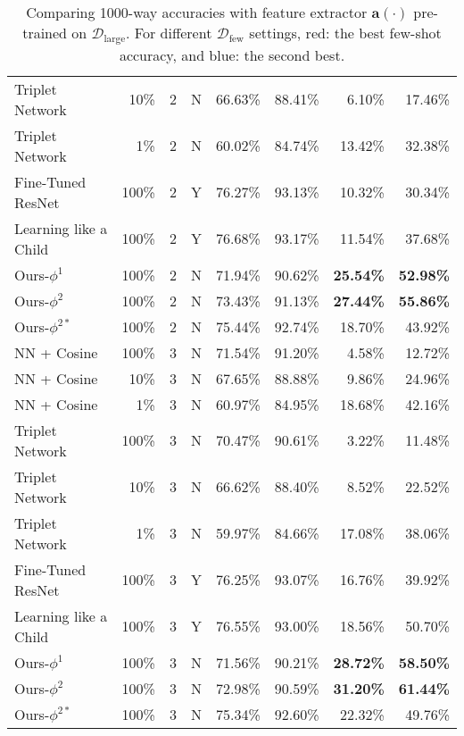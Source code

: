 \begin{table*}
\begin{tabular}{lrccll:rr}
        Triplet Network~\cite{siamese,lin2017transfer}  &  10\% & 2 & N & 66.63\% & 88.41\% & 6.10\% & 17.46\% \\
        Triplet Network~\cite{siamese,lin2017transfer}  &   1\% & 2 & N & 60.02\% & 84.74\% & 13.42\% & 32.38\% \\
        Fine-Tuned ResNet~\cite{DBLP:conf/cvpr/HeZRS16} & 100\% & 2 & Y & 76.27\% & 93.13\% & 10.32\% & 30.34\% \\
        Learning like a Child~\cite{mao2015learning} & 100\% & 2 & Y & 76.68\% & 93.17\% & 11.54\% & 37.68\% \\
        \hdashline
        Ours-$\phi^1$         & 100\% & 2 & N & 71.94\% & 90.62\% & {\bf\color{blue}25.54\%} & {\bf\color{blue}52.98\%} \\
        Ours-$\phi^2$         & 100\% & 2 & N & 73.43\% & 91.13\% & {\bf\color{red}27.44\%} & {\bf\color{red}55.86\%} \\
        Ours-$\phi^{2*}$      & 100\% & 2 & N & 75.44\% & 92.74\% & 18.70\% & 43.92\% \\
        \midrule
        NN + Cosine  & 100\% & 3 & N & 71.54\% & 91.20\% & 4.58\% & 12.72\% \\
        NN + Cosine  &  10\% & 3 & N & 67.65\% & 88.88\% & 9.86\% & 24.96\% \\
        NN + Cosine  &   1\% & 3 & N & 60.97\% & 84.95\% & 18.68\% & 42.16\% \\
        Triplet Network~\cite{siamese,lin2017transfer}  & 100\% & 3 & N & 70.47\% & 90.61\% & 3.22\% & 11.48\% \\
        Triplet Network~\cite{siamese,lin2017transfer}  &  10\% & 3 & N & 66.62\% & 88.40\% & 8.52\% & 22.52\% \\
        Triplet Network~\cite{siamese,lin2017transfer}  &   1\% & 3 & N & 59.97\% & 84.66\% & 17.08\% & 38.06\% \\
        Fine-Tuned ResNet~\cite{DBLP:conf/cvpr/HeZRS16} & 100\% & 3 & Y & 76.25\% & 93.07\% & 16.76\% & 39.92\% \\
        Learning like a Child~\cite{mao2015learning} & 100\% & 3 & Y & 76.55\% & 93.00\% & 18.56\% & 50.70\% \\
        \hdashline
        Ours-$\phi^1$         & 100\% & 3 & N & 71.56\% & 90.21\% & {\bf\color{blue}28.72\%} & {\bf\color{blue}58.50\%} \\
        Ours-$\phi^2$         & 100\% & 3 & N & 72.98\% & 90.59\% & {\bf\color{red}31.20\%} & {\bf\color{red}61.44\%} \\
        Ours-$\phi^{2*}$      & 100\% & 3 & N & 75.34\% & 92.60\% & 22.32\% & 49.76\% \\
        \bottomrule
    \end{tabular}
    \caption{Comparing 1000-way accuracies with feature extractor $\mathbf{a}(\cdot)$ pre-trained on $\mathcal{D}_{\text{large}}$. For different $\mathcal{D}_{\text{few}}$ settings, red: the best few-shot accuracy, and blue: the second best.}
    \label{tab:real1}
\end{table*}



